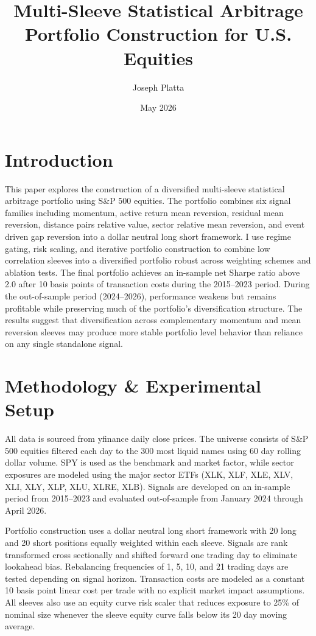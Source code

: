 \documentclass{article}
\title{Multi-Sleeve Statistical Arbitrage Portfolio Construction for U.S. Equities}
\author{Joseph Platta}
\date{May 2026}
\begin{document}
\maketitle

\section{Introduction}

This paper explores the construction of a diversified multi-sleeve statistical arbitrage portfolio using S\&P 500 equities. The portfolio combines six signal families including momentum, active return mean reversion, residual mean reversion, distance pairs relative value, sector relative mean reversion, and event driven gap reversion into a dollar neutral long short framework. I use regime gating, risk scaling, and iterative portfolio construction to combine low correlation sleeves into a diversified portfolio robust across weighting schemes and ablation tests. The final portfolio achieves an in-sample net Sharpe ratio above 2.0 after 10 basis points of transaction costs during the 2015–2023 period. During the out-of-sample period (2024–2026), performance weakens but remains profitable while preserving much of the portfolio’s diversification structure. The results suggest that diversification across complementary momentum and mean reversion sleeves may produce more stable portfolio level behavior than reliance on any single standalone signal.

\section{Methodology \& Experimental Setup}

All data is sourced from yfinance daily close prices. The universe consists of S\&P 500 equities filtered each day to the 300 most liquid names using 60 day rolling dollar volume. SPY is used as the benchmark and market factor, while sector exposures are modeled using the major sector ETFs (XLK, XLF, XLE, XLV, XLI, XLY, XLP, XLU, XLRE, XLB). Signals are developed on an in-sample period from 2015–2023 and evaluated out-of-sample from January 2024 through April 2026.

Portfolio construction uses a dollar neutral long short framework with 20 long and 20 short positions equally weighted within each sleeve. Signals are rank transformed cross sectionally and shifted forward one trading day to eliminate lookahead bias. Rebalancing frequencies of 1, 5, 10, and 21 trading days are tested depending on signal horizon. Transaction costs are modeled as a constant 10 basis point linear cost per trade with no explicit market impact assumptions. All sleeves also use an equity curve risk scaler that reduces exposure to 25\% of nominal size whenever the sleeve equity curve falls below its 20 day moving average.
\end{document}
